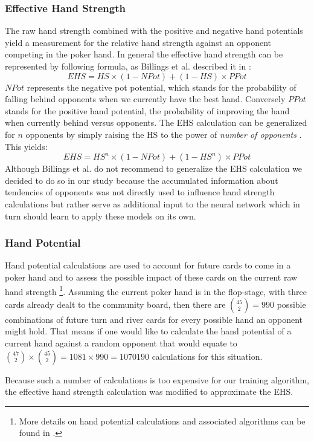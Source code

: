 \subsubsection{Effective Hand Strength}
The raw hand strength combined with the positive and negative hand potentials yield a measurement for the relative hand strength against an opponent competing in the poker hand. In general the effective hand strength can be represented by following formula, as Billings et al. described it in \cite[p. 216]{challenge_of_poker}:
\begin{equation}
\label{eq:ehs}
EHS = HS \times (1 - NPot) + (1-HS) \times PPot
\end{equation}
$NPot$ represents the negative pot potential, which stands for the probability of falling behind opponents when we currently have the best hand. Conversely $PPot$ stands for the positive hand potential, the probability of improving the hand when currently behind versus opponents. The EHS calculation can be generalized for $n$ opponents by simply raising the HS to the power of \textit{number of opponents} \cite{opp_modeling}. This yields:
\begin{equation}
\label{eq:ehs_n_opp}
EHS = HS^{n} \times (1 - NPot) + (1-HS^{n}) \times PPot
\end{equation}
Although Billings et al. do not recommend to generalize the EHS calculation we decided to do so in our study because the accumulated information about tendencies of opponents was not directly used to influence hand strength calculations but rather serve as additional input to the neural network which in turn should learn to apply these models on its own.

\subsubsection{Hand Potential}
\label{subsubsec:hp}
Hand potential calculations are used to account for future cards to come in a poker hand and to assess the possible impact of these cards on the current raw hand strength \cite{challenge_of_poker}\footnote{More details on hand potential calculations and associated algorithms can be found in \cite[p. 216-218]{challenge_of_poker}.}.  
Assuming the current poker hand is in the flop-stage, with three cards already dealt to the community board, then there are ${45\choose 2} = 990$ possible combinations of future turn and river cards for every possible hand an opponent might hold. That means if one would like to calculate the hand potential of a current hand against a random opponent that would equate to ${47\choose 2} \times {45\choose 2} = 1081 \times 990 = 1070190$ calculations for this situation. \par
Because such a number of calculations is too expensive for our training algorithm, the effective hand strength calculation was modified to approximate the EHS.
